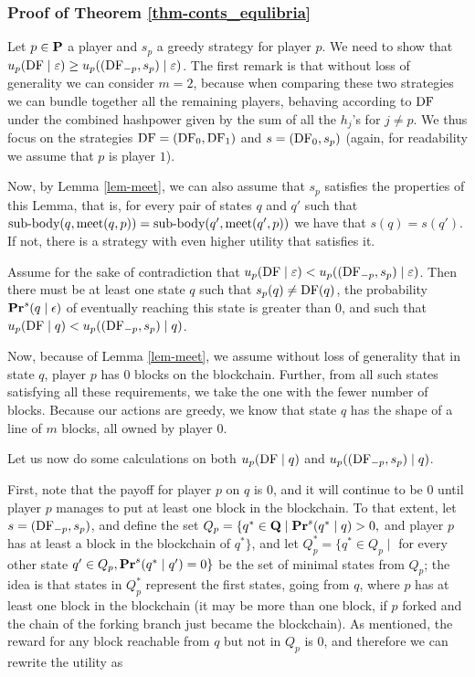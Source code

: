 \subsubsection{Proof of Theorem \ref{thm-conts_equlibria}} 

Let $p \in \mathbf{P}$ a player and $s_p$ a greedy strategy for player $p$. We need to show that 
$u_p(\text{\rm DF} \mid \varepsilon) \geq u_p( (\text{\rm DF}_{-p},s_p) \mid \varepsilon)$. The first remark is that without loss of generality we can consider 
$m = 2$, because when comparing these two strategies we can bundle together all the remaining players, behaving according to $\text{\rm DF}$ 
under the combined hashpower given by the sum of all the $h_j$'s for $j \neq p$. We thus focus on the strategies 
$\text{\rm DF} = (\text{\rm DF}_0,\text{\rm DF}_1)$ and $s = (\text{\rm DF}_0,s_p)$ (again, for readability we assume that $p$ is player $1$). 

Now, by Lemma \ref{lem-meet}, we can also assume that $s_p$ satisfies the properties of this Lemma, that is, for every 
pair of states $q$ and $q'$ such that ${\text{\rm sub-body}}(q,\text{\rm meet}(q,p)) = {\text{\rm sub-body}}(q',\text{\rm meet}(q',p))$ we have that $s(q) = s(q')$. If not, there is a strategy with even higher utility that satisfies it. 

Assume for the sake of contradiction that $u_p(\text{\rm DF} \mid \varepsilon) < u_p( (\text{\rm DF}_{-p},s_p) \mid \varepsilon)$. Then there must be at least one 
state $q$ such that $s_p(q) \neq \text{\rm DF}(q)$, the probability $\mathbf{Pr}^s(q \mid \epsilon)$ of eventually reaching this state is greater than $0$, and such that $u_p(\text{\rm DF} \mid q) < u_p( (\text{\rm DF}_{-p},s_p) \mid q)$. 


Now, because of Lemma \ref{lem-meet}, we assume without loss of generality that in state $q$, player $p$ has $0$ blocks on the blockchain. Further, from all such states satisfying all these requirements, we take the one with the fewer number of blocks. Because our actions are greedy, we know that state $q$ has the shape of a line of $m$ blocks, all owned by player $0$. 

Let us now do some calculations on both $u_p(\text{\rm DF} \mid q)$ and $u_p( (\text{\rm DF}_{-p},s_p) \mid q)$. 
\medskip

First, note that the payoff for player $p$ on $q$ is $0$, and it will continue to be $0$ until player $p$ manages to put at least one block in the blockchain. To that extent, let $s = (\text{\rm DF}_{-p},s_p)$, and define the set 
$Q_p = \{q^* \in \mathbf{Q} \mid \mathbf{Pr}^s(q^* \mid q) > 0, $ and player $p$ has at least a block in the blockchain of $q^* \}$, 
and let $Q^*_p=\{q^* \in Q_p \mid$ for every other state $q' \in Q_p, \mathbf{Pr}^s(q^* \mid q')=0 \}$ be the set of minimal states from $Q_p$; 
the idea is that states in $Q^*_p$ represent the first states, going from $q$, where $p$ has at least one block in the blockchain 
(it may be more than one block, if $p$ forked and the chain of the forking branch just became the blockchain). 
As mentioned, the reward for any block reachable from $q$ but not in $Q_p$ is $0$, and therefore we can rewrite the utility as

